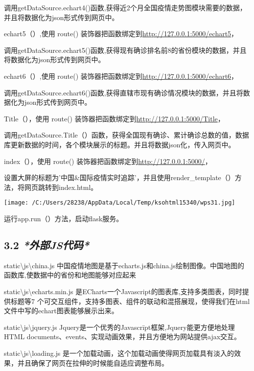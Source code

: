 \documentclass[
]{article}
\begin{document}
调用getDataSource.echart4()函数,获得近2个月全国疫情走势图模块需要的数据，并且将数据化为json形式传到网页中。

echart5（）,使用 route()
装饰器把函数绑定到\url{http://127.0.0.1:5000/echart5}，

调用getDataSource.echart5()函数,获得现有确诊排名前8的省份模块的数据，并且将数据化为json形式传到网页中。

echart6（）,使用 route()
装饰器把函数绑定到\url{http://127.0.0.1:5000/echart6}，

调用getDataSource.echart6()函数,获得直辖市现有确诊情况模块的数据，并且将数据化为json形式传到网页中。

Title（），使用 route()
装饰器把函数绑定到\url{http://127.0.0.1:5000/Title}，

调用getDataSource.Title（）函数，获得全国现有确诊、累计确诊总数的值，数据库更新数据的时间，各个模块展示的标题。并且将数据json化，传入网页中。

index（），使用 route() 装饰器把函数绑定到\url{http://127.0.0.1:5000/}，

设置大屏的标题为'中国\&国际疫情实时追踪'，并且使用render\_template（）方法，将网页跳转到index.html。

\texttt{[image: /C:/Users/28238/AppData/Local/Temp/ksohtml15340/wps31.jpg]}

运行app.run（）方法，启动flask服务。

\hypertarget{32-ux5916ux90e8jsux4ee3ux7801}{%
\subsection{\texorpdfstring{\textbf{3.2}
\emph{\textbf{*外部JS代码*}}}{3.2 *外部JS代码*}}\label{32-ux5916ux90e8jsux4ee3ux7801}}

static\textbackslash js\textbackslash china.js
中国疫情地图是基于echarts.js和china.js绘制图像。中国地图的函数库,使数据中的省份和地图能够对应起来

static\textbackslash js\textbackslash echarts.min.js
是ECharts一个Javascript的图表库,支持多类图表，同时提供标题等7
个可交互组件，支持多图表、组件的联动和混搭展现，使得我们在html文件中写的echart图表能够展示出来。

static\textbackslash js\textbackslash jquery.js
Jquery是一个优秀的Javascrīpt框架,Jquery能更方便地处理HTML
documents、events、实现动画效果，并且方便地为网站提供ajax交互。

static\textbackslash js\textbackslash loading.js
是一个加载动画，这个加载动画使得网页加载具有淡入的效果，并且确保了网页在拉伸的时候能自适应调整布局。
\end{document}

